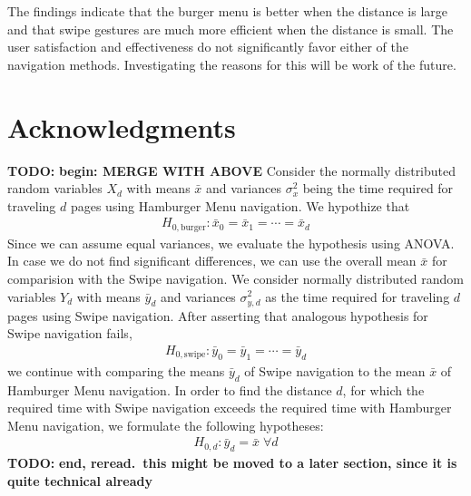 \documentclass{sig-alternate-05-2015}
\newcommand{\todo}{\textbf{TODO:} \textbf}
\begin{document}
The findings indicate that the burger menu is better when the distance is large and that swipe gestures are much more efficient
when the distance is small. The user satisfaction and effectiveness do not significantly favor either of the navigation methods.
Investigating the reasons for this will be work of the future.

\section{Acknowledgments}

%

%
%
\newpage
\onecolumn
\appendix
\todo{begin: MERGE WITH ABOVE}
Consider the normally distributed random variables $X_d$ with means $\bar x$ and
variances $\sigma_x^2$ being the time required for traveling $d$ pages using Hamburger
Menu navigation.
We hypothize that
\begin{align*}
	H_{0, \text{burger}}: \bar x_0 = \bar x_1 = \cdots = \bar x_d
\end{align*}
Since we can assume equal variances,
we evaluate the hypothesis using {ANOVA}.
In case we do not find significant differences, we can use the overall mean
$\bar x$ for comparision with the Swipe navigation. 
We consider normally
distributed random variables $Y_d$ with means $\bar y_d$ and variances $\sigma_{y,d}^2$ as the
time required for traveling $d$ pages using Swipe navigation. 
After asserting
that analogous hypothesis for Swipe navigation fails,
\begin{align*}
	H_{0, \text{swipe}}: \bar y_0 = \bar y_1= \cdots = \bar y_d
\end{align*}
we continue with comparing the means $\bar y_d$ of Swipe navigation to the
mean $\bar x$ of Hamburger Menu navigation.  In order to find the distance
$d$, for which the required time with Swipe navigation exceeds the required
time with Hamburger Menu navigation, we formulate the following hypotheses:
\begin{align*}
	H_{0,d} : \bar y_d = \bar x \;\forall d
\end{align*}
\todo{end, reread.\ this might be moved to a later section, since it is
	quite technical already}
\end{document}
